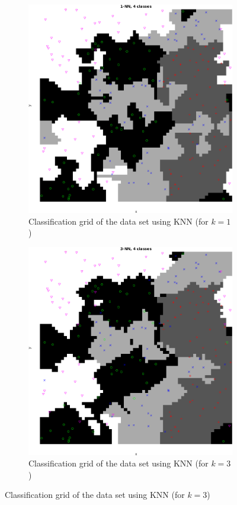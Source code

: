 \documentclass[10pt]{article}
\begin{document}
\begin{figure}[H]
  \centering
  \begin{subfigure}{.49\textwidth}
    \includegraphics[width=.8\linewidth]{assign2_4_1.png}
    \caption{Classification grid of the data set using KNN (for $k=1$)}
    \label{fig2.4a}
  \end{subfigure}
  \begin{subfigure}{.49\textwidth}
    \includegraphics[width=.8\linewidth]{assign2_4_3.png}
    \caption{Classification grid of the data set using KNN (for $k=3$)}
    \label{fig2.4b}
  \end{subfigure}

\end{figure}
\end{document}
